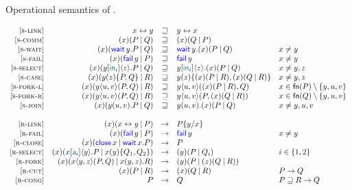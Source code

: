 \begin{table}
    \caption{Operational semantics of \Calculus.}
    \[
        \begin{array}{rrcll}
        \SLink &
        \Link\x\y & \pcong & \Link\y\x \\
        \SComm &
        \Cut\x{P}{Q} & \pcong & \Cut\x{Q}{P} \\
        \SWait &
        \Cut\x{\Wait\y.P}{Q} & \pcong & \Wait\y.\Cut\x{P}{Q} & x \ne y \\
        \SFail &
        \Cut\x{\Fail\y}{P} & \pcong & \Fail\y & x \ne y \\
        \SSelect &
        \Cut\x{\Select\y{\InTag_i}\z.P}{Q} & \pcong & \Select\y{\InTag_i}\z.\Cut\x{P}{Q} & x \ne y,z \\
        \SCase &
        \Cut\x{\Case\y\z{P}{Q}}{R} & \pcong & \Case\y\z{\Cut\x{P}{R}}{\Cut\x{Q}{R}} & x \ne y,z \\
        \SForkL &
        \Cut\x{\Fork\y\u\v{P}{Q}}{R} & \pcong & \Fork\y\u\v{\Cut\x{P}{R}}{Q} & x \in \fn{P}\setminus\set{y,u,v} \\
        \SForkR &
        \Cut\x{\Fork\y\u\v{P}{Q}}{R} & \pcong & \Fork\y\u\v{P}{\Cut\x{Q}{R}} & x \in \fn{Q}\setminus\set{y,u,v} \\
        \SJoin &
        \Cut\x{\Join\y\u\v.P}{Q} & \pcong & \Join\y\u\v.\Cut\x{P}{Q} & x \ne y,u,v \\
        \\
        \RLink &
        \Cut\x{\Link\x\y}{P} & \red & P\subst\y\x \\
        \RFail &
        \Cut\x{\Fail\y}{P} & \red & \Fail\y & x \ne y \\
        \RClose &
        \Cut\x{\Close\x}{\Wait\x.P} & \red & P \\
        \RSelect &
        \Cut\x{\Select\x{\Tag_i}\y.P}{\Case\x\y{Q_1}{Q_2}} & \red & \Cut\y{P}{Q_i} & i\in\set{1,2} \\
        \RFork &
        \Cut\x{\Fork\x\y\z{P}{Q}}{\Join\x\y\z.R} & \red & \Cut\y{P}{\Cut\z{Q}{R}} \\
        \RCut &
        \Cut\x{P}{R} & \red & \Cut\x{Q}{R} & P \red Q \\
        \RCong &
        P & \red & Q & P \pcong R \red Q \\
        \end{array}
    \]
\end{table}
